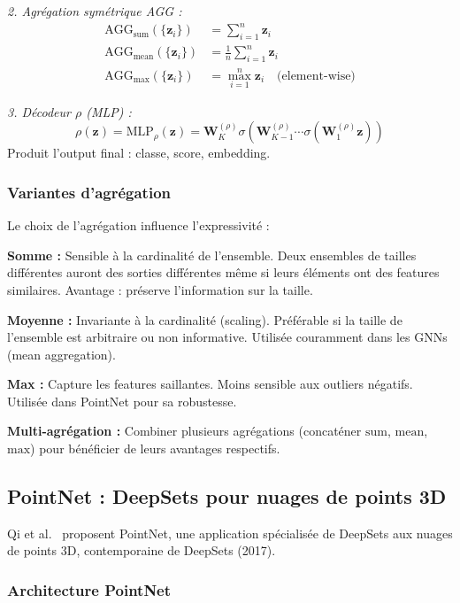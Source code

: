 \textit{2. Agrégation symétrique AGG :}
\begin{align*}
\text{AGG}_{\text{sum}}(\{\mathbf{z}_i\}) &= \sum_{i=1}^n \mathbf{z}_i \\
\text{AGG}_{\text{mean}}(\{\mathbf{z}_i\}) &= \frac{1}{n}\sum_{i=1}^n \mathbf{z}_i \\
\text{AGG}_{\text{max}}(\{\mathbf{z}_i\}) &= \max_{i=1}^n \mathbf{z}_i \quad \text{(element-wise)}
\end{align*}

\textit{3. Décodeur $\rho$ (MLP) :}
\[
\rho(\mathbf{z}) = \text{MLP}_\rho(\mathbf{z}) = \mathbf{W}_K^{(\rho)} \sigma(\mathbf{W}_{K-1}^{(\rho)} \cdots \sigma(\mathbf{W}_1^{(\rho)} \mathbf{z}))
\]
Produit l'output final : classe, score, embedding.

\subsubsection{Variantes d'agrégation}

Le choix de l'agrégation influence l'expressivité :

\textbf{Somme :}
Sensible à la cardinalité de l'ensemble. Deux ensembles de tailles différentes auront des sorties différentes même si leurs éléments ont des features similaires. Avantage : préserve l'information sur la taille.

\textbf{Moyenne :}
Invariante à la cardinalité (scaling). Préférable si la taille de l'ensemble est arbitraire ou non informative. Utilisée couramment dans les GNNs (mean aggregation).

\textbf{Max :}
Capture les features saillantes. Moins sensible aux outliers négatifs. Utilisée dans PointNet pour sa robustesse.

\textbf{Multi-agrégation :}
Combiner plusieurs agrégations (concaténer $\text{sum}$, $\text{mean}$, $\text{max}$) pour bénéficier de leurs avantages respectifs.

\subsection{PointNet : DeepSets pour nuages de points 3D}

Qi et al.~\cite{Qi2017} proposent PointNet, une application spécialisée de DeepSets aux nuages de points 3D, contemporaine de DeepSets (2017).

\subsubsection{Architecture PointNet}

